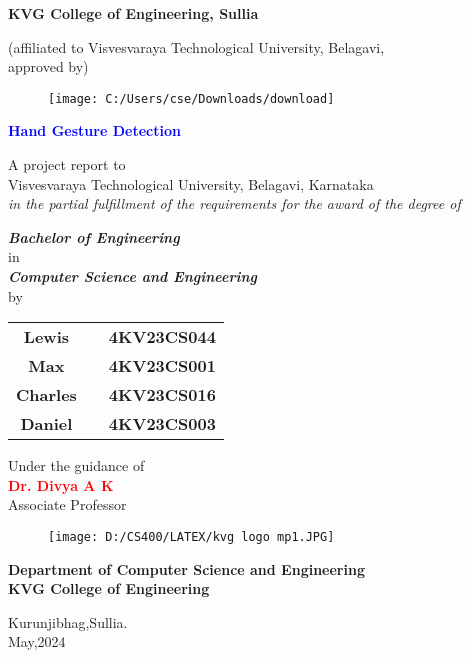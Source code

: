 \documentclass{report}
\begin{document}
	\newlength{\toptafiddle}
	\newlength{\bottafiddle}
	\thispagestyle{empty}
	\centering
	\setlength{\toptafiddle}{1in}
	\setlength{\bottafiddle}{1in}
	\vspace*{-0.75in}
	\enlargethispage{\toptafiddle}
	
	\begin{LARGE}
		\textbf{KVG College of Engineering, Sullia}\\
	\end{LARGE}
	
	\begin{small}
		(affiliated to Visvesvaraya Technological University, Belagavi,\\
		approved by)\\
	\end{small}
	
	\begin{figure}
		\centering
		\texttt{[image: C:/Users/cse/Downloads/download]}
		\vspace{0.5cm}
		\vfill
		
	\end{figure}
	\huge{\textbf{\textcolor{blue}{Hand Gesture Detection}}}
	\vfill
	\begin{small}
		A project report to\\
		Visvesvaraya Technological University, Belagavi, Karnataka\\
		\textit{in the partial fulfillment of the requirements for the award of the degree of}\\
	\end{small}
	
	\begin{normalsize}
		\textbf{\textit{Bachelor of Engineering}} \\
		in \\
		\textbf{\textit{Computer Science and Engineering}} \\
		by \\
	\end{normalsize}
	\vfill
	\begin{tabular}{ccc}
		\textbf{Lewis} & & \textbf{4KV23CS044} \\
		\textbf{Max} & & \textbf{4KV23CS001} \\
		\textbf{Charles} & & \textbf{4KV23CS016} \\   
		\textbf{Daniel} & & \textbf{4KV23CS003} \\
	\end{tabular}
	\vfill
	{\large Under the guidance of}\\
	\huge{\textbf{\textcolor{red}{Dr. Divya A K}}}\\
	\large Associate Professor\
	\vfill
	\begin{figure}[h]
		\centering
		\texttt{[image: D:/CS400/LATEX/kvg logo mp1.JPG]}
	\end{figure}
	
	\textbf{Department of Computer Science and Engineering}\\
	\textbf{KVG College of Engineering}\\
	\begin{large}
		Kurunjibhag,Sullia.\\
		May,2024
	\end{large}
\end{document}
